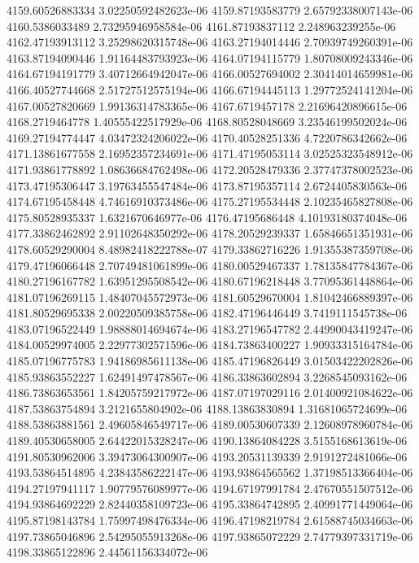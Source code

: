 {4159.60526883334 3.02250592482623e-06
4159.87193583779 2.65792338007143e-06
4160.5386033489 2.73295946958584e-06
4161.87193837112 2.248963239255e-06
4162.47193913112 3.25298620315748e-06
4163.27194014446 2.70939749260391e-06
4163.87194090446 1.91164483793923e-06
4164.07194115779 1.80708009243346e-06
4164.67194191779 3.40712664942047e-06
4166.00527694002 2.30414014659981e-06
4166.40527744668 2.51727512575194e-06
4166.67194445113 1.29772524141204e-06
4167.00527820669 1.99136314783365e-06
4167.6719457178 2.21696420896615e-06
4168.2719464778 1.40555422517929e-06
4168.80528048669 3.23546199502024e-06
4169.27194774447 4.03472324206022e-06
4170.40528251336 4.7220786342662e-06
4171.13861677558 2.16952357234691e-06
4171.47195053114 3.02525323548912e-06
4171.93861778892 1.08636684762498e-06
4172.20528479336 2.37747378002523e-06
4173.47195306447 3.19763455547484e-06
4173.87195357114 2.6724405830563e-06
4174.67195458448 4.74616910373486e-06
4175.27195534448 2.10235465827808e-06
4175.80528935337 1.6321670646977e-06
4176.47195686448 4.10193180374048e-06
4177.33862462892 2.91102648350292e-06
4178.20529239337 1.65846651351931e-06
4178.60529290004 8.48982418222788e-07
4179.33862716226 1.91355387359708e-06
4179.47196066448 2.70749481061899e-06
4180.00529467337 1.78135847784367e-06
4180.27196167782 1.63951295508542e-06
4180.67196218448 3.77095361448864e-06
4181.07196269115 1.48407045572973e-06
4181.60529670004 1.81042466889397e-06
4181.80529695338 2.00220509385758e-06
4182.47196446449 3.7419111545738e-06
4183.07196522449 1.98888014694674e-06
4183.27196547782 2.44990043419247e-06
4184.00529974005 2.22977302571596e-06
4184.73863400227 1.90933315164784e-06
4185.07196775783 1.94186985611138e-06
4185.47196826449 3.01503422202826e-06
4185.93863552227 1.62491497478567e-06
4186.33863602894 3.2268545093162e-06
4186.73863653561 1.84205759217972e-06
4187.07197029116 2.01400921084622e-06
4187.53863754894 3.2121655804902e-06
4188.13863830894 1.31681065724699e-06
4188.53863881561 2.49605846549717e-06
4189.00530607339 2.12608978960784e-06
4189.40530658005 2.64422015328247e-06
4190.13864084228 3.5155168613619e-06
4191.80530962006 3.39473064300907e-06
4193.20531139339 2.9191272481066e-06
4193.53864514895 4.23843586222147e-06
4193.93864565562 1.37198513366404e-06
4194.27197941117 1.90779576089977e-06
4194.67197991784 2.47670551507512e-06
4194.93864692229 2.82440358109723e-06
4195.33864742895 2.40991771449064e-06
4195.87198143784 1.75997498476334e-06
4196.47198219784 2.61588745034663e-06
4197.73865046896 2.54295055913268e-06
4197.93865072229 2.74779397331719e-06
4198.33865122896 2.44561156334072e-06
}
